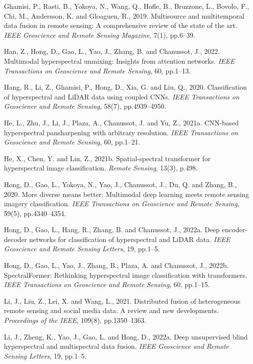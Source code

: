 \documentclass[pdflatex,sn-mathphys-num]{sn-jnl}
\begin{document}
\begin{thebibliography}{}
Ghamisi, P., Rasti, B., Yokoya, N., Wang, Q., Hofle, B., Bruzzone, L., Bovolo, F., Chi, M., Andersson, K. and Gloaguen, R., 2019.
Multisource and multitemporal data fusion in remote sensing: A comprehensive review of the state of the art.
\textit{IEEE Geoscience and Remote Sensing Magazine}, 7(1), pp.6--39.

Han, Z., Hong, D., Gao, L., Yao, J., Zhang, B. and Chanussot, J., 2022.
Multimodal hyperspectral unmixing: Insights from attention networks.
\textit{IEEE Transactions on Geoscience and Remote Sensing}, 60, pp.1--13.

Hang, R., Li, Z., Ghamisi, P., Hong, D., Xia, G. and Liu, Q., 2020.
Classification of hyperspectral and LiDAR data using coupled CNNs.
\textit{IEEE Transactions on Geoscience and Remote Sensing}, 58(7), pp.4939--4950.

He, L., Zhu, J., Li, J., Plaza, A., Chanussot, J. and Yu, Z., 2021a.
CNN-based hyperspectral pansharpening with arbitrary resolution.
\textit{IEEE Transactions on Geoscience and Remote Sensing}, 60, pp.1--21.

He, X., Chen, Y. and Lin, Z., 2021b.
Spatial-spectral transformer for hyperspectral image classification.
\textit{Remote Sensing}, 13(3), p.498.

Hong, D., Gao, L., Yokoya, N., Yao, J., Chanussot, J., Du, Q. and Zhang, B., 2020.
More diverse means better: Multimodal deep learning meets remote sensing imagery classification.
\textit{IEEE Transactions on Geoscience and Remote Sensing}, 59(5), pp.4340--4354.

Hong, D., Gao, L., Hang, R., Zhang, B. and Chanussot, J., 2022a.
Deep encoder-decoder networks for classification of hyperspectral and LiDAR data.
\textit{IEEE Geoscience and Remote Sensing Letters}, 19, pp.1--5.

Hong, D., Gao, L., Yao, J., Zhang, B., Plaza, A. and Chanussot, J., 2022b.
SpectralFormer: Rethinking hyperspectral image classification with transformers.
\textit{IEEE Transactions on Geoscience and Remote Sensing}, 60, pp.1--15.

Li, J., Liu, Z., Lei, X. and Wang, L., 2021.
Distributed fusion of heterogeneous remote sensing and social media data: A review and new developments.
\textit{Proceedings of the IEEE}, 109(8), pp.1350--1363.

Li, J., Zheng, K., Yao, J., Gao, L. and Hong, D., 2022a.
Deep unsupervised blind hyperspectral and multispectral data fusion.
\textit{IEEE Geoscience and Remote Sensing Letters}, 19, pp.1--5.


\end{thebibliography}
\end{document}

